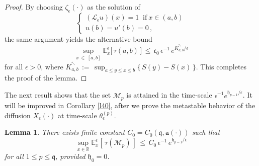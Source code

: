 \documentclass[reqno]{amsart}
\theoremstyle{plain}
\newtheorem{lemma}[theorem]{Lemma}
\theoremstyle{definition}
\newcommand{\mf}[1]{{\mathfrak #1}}
\newcommand{\bb}[1]{{\mathbb #1}}
\newcommand{\ms}[1]{{\mathscr #1}}
\newcommand{\mtt}[1]{{\mathtt #1}}
\newcounter{as}[section]
\newcommand{\<}{\langle}
\renewcommand{\>}{\rangle}
\begin{document}
\begin{proof}
By choosing $\zeta_\epsilon (\cdot)$ as the solution of 
\begin{equation*}
\begin{cases}
(\ms L_{\epsilon}u)(x) = 1 \;\; \text{if}\ x\in (a, b)
\\
u(b) = u'(b) = 0\,,
\end{cases}
\end{equation*}
the same argument yields the alternative bound
\begin{equation*}
\sup_{x\;\in\; [a,b]}\bb
E^\epsilon_{x}\big[\, \tau(a,b)\, \big]
\, \leq\, \mf c_0 \,  \epsilon^{-1}\, e^{K^{^\nwarrow}_{a,b}/\epsilon}
\end{equation*}
for all $\epsilon > 0$, where
$K^{^\nwarrow}_{a,b}\,:=\, \sup_{a \le y\le x \le b} \{\, S(y)-S(x)\,\}$.  This
completes the proof of the lemma.
\end{proof}

The next result shows that the set $\ms M_p$ is attained in the
time-scale $\epsilon^{-1} e^{\mf h_{p-1}/\epsilon}$. It will be
improved in Corollary \ref{l40}, after we prove the metastable
behavior of the diffusion $X_\epsilon(\cdot)$ at time-scale
$\theta^{(p)}_\epsilon$.  

\begin{lemma}
\label{l33}
There exists finite constant $C_0 = C_0(\mf q, \mtt a(\cdot))$ such
that
\begin{equation*}
\sup_{x\in \bb R}
\bb E_{x}^{\epsilon} [\, \tau (\ms M_p) \, ]
\,\le\, C_0 \, \epsilon^{-1}\, e^{\mf h_{p-1}/\epsilon}
\end{equation*}
for all $1\le p\le \mf q$, provided $\mf h_0=0$.
\end{lemma}
\end{document}
